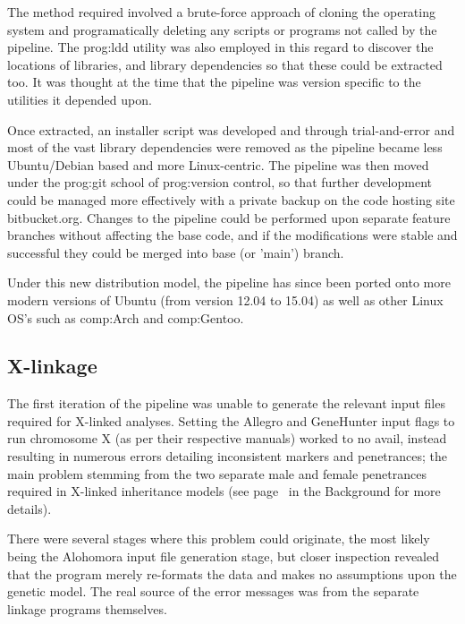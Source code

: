 The method required involved a brute-force approach of cloning the operating system and programatically deleting any scripts or programs not called by the pipeline. The \gls{prog:ldd} utility was also employed in this regard to discover the locations of libraries, and library dependencies so that these could be extracted too. It was thought at the time that the pipeline was version specific to the utilities it depended upon.

Once extracted, an installer script was developed and through trial-and-error and most of the vast library dependencies were removed as the pipeline became less Ubuntu/Debian based and more Linux-centric. The pipeline was then moved under the \gls{prog:git} school of \gls{prog:version control}, so that further development could be managed more effectively with a private backup on the code hosting site bitbucket.org. Changes to the pipeline could be performed upon separate feature branches without affecting the base code, and if the modifications were stable and successful they could be merged into base (or 'main') branch. 

Under this new distribution model, the pipeline has since been ported onto more modern versions of Ubuntu (from version 12.04 to 15.04) as well as other Linux OS's such as \gls{comp:Arch} and \gls{comp:Gentoo}.


\subsection{X-linkage}

The first iteration of the pipeline was unable to generate the relevant input files required for X-linked analyses. Setting the Allegro and GeneHunter input flags to run chromosome X (as per their respective manuals) worked to no avail, instead resulting in numerous errors detailing inconsistent markers and penetrances; the main problem stemming from the two separate male and female penetrances required in X-linked inheritance models (see page~\pageref{ref:back:xlinkrec} in the Background for more details).

There were several stages where this problem could originate, the most likely being the Alohomora input file generation stage, but closer inspection revealed that the program merely re-formats the data and makes no assumptions upon the genetic model. The real source of the error messages was from the separate linkage programs themselves.

